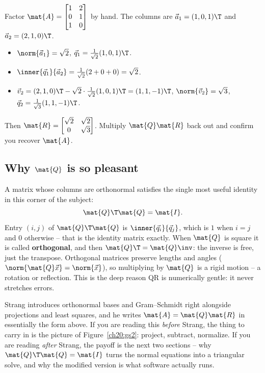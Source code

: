 \begin{labbox}
Factor $\mat{A}=\begin{bmatrix}1&2\\0&1\\1&0\end{bmatrix}$ by hand. The columns are
$\vec{a}_1=(1,0,1)\T$ and $\vec{a}_2=(2,1,0)\T$.
\begin{itemize}
  \item $\norm{\vec{a}_1}=\sqrt2$, $\vec{q}_1=\tfrac{1}{\sqrt2}(1,0,1)\T$.
  \item $\inner{\vec{q}_1}{\vec{a}_2}=\tfrac{1}{\sqrt2}(2+0+0)=\sqrt2$.
  \item $\vec{v}_2=(2,1,0)\T-\sqrt2\cdot\tfrac{1}{\sqrt2}(1,0,1)\T=(1,1,-1)\T$,
        $\norm{\vec{v}_2}=\sqrt3$, $\vec{q}_2=\tfrac{1}{\sqrt3}(1,1,-1)\T$.
\end{itemize}
Then $\mat{R}=\begin{bmatrix}\sqrt2 & \sqrt2\\ 0 & \sqrt3\end{bmatrix}$. Multiply
$\mat{Q}\mat{R}$ back out and confirm you recover $\mat{A}$.
\end{labbox}

\subsection{Why \texorpdfstring{$\mat{Q}$}{Q} is so pleasant}

A matrix whose columns are orthonormal satisfies the single most useful identity in
this corner of the subject:
\[
  \mat{Q}\T\mat{Q} = \mat{I}.
\]
Entry $(i,j)$ of $\mat{Q}\T\mat{Q}$ is $\inner{\vec{q}_i}{\vec{q}_j}$, which is $1$ when
$i=j$ and $0$ otherwise -- that is the identity matrix exactly. When $\mat{Q}$ is
square it is called \textbf{orthogonal}, and then $\mat{Q}\T=\mat{Q}\inv$: the inverse
is free, just the transpose. Orthogonal matrices preserve lengths and angles
($\norm{\mat{Q}\vec{x}}=\norm{\vec{x}}$), so multiplying by $\mat{Q}$ is a rigid motion
-- a rotation or reflection. This is the deep reason QR is numerically gentle: it never
stretches errors.

\begin{strangbox}
Strang introduces orthonormal bases and Gram--Schmidt right alongside projections and
least squares, and he writes $\mat{A}=\mat{Q}\mat{R}$ in essentially the form above. If
you are reading this \emph{before} Strang, the thing to carry in is the picture of
Figure~\ref{ch20:gs2}: project, subtract, normalize. If you are reading \emph{after}
Strang, the payoff is the next two sections -- why $\mat{Q}\T\mat{Q}=\mat{I}$ turns the
normal equations into a triangular solve, and why the modified version is what
software actually runs.
\end{strangbox}

